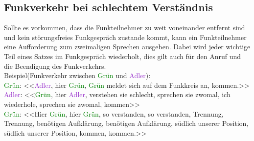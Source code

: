 \subsection{Funkverkehr bei schlechtem Verständnis}
	Sollte es vorkommen, dass die Funkteilnehmer zu weit voneinander entfernt sind und kein störungsfreies Funkgespräch zustande kommt, kann ein Funkteilnehmer eine Aufforderung zum zweimaligen Sprechen ausgeben. Dabei wird jeder wichtige Teil eines Satzes im Funkgespräch wiederholt, dies gilt auch für den Anruf und die Beendigung des Funkverkehrs. \\
	Beispiel(Funkverkehr zwischen \textcolor{green}{Grün} und \textcolor{DarkOrchid}{Adler}): \\
	\textcolor{green}{Grün}: <<\textcolor{DarkOrchid}{Adler}, hier \textcolor{green}{Grün}, \textcolor{green}{Grün} meldet sich auf dem Funkkreis an, kommen.>> \\
	\textcolor{DarkOrchid}{Adler}: <<\textcolor{green}{Grün}, hier \textcolor{DarkOrchid}{Adler}, verstehen sie schlecht, sprechen sie zwomal, ich wiederhole, sprechen sie zwomal, kommen>> \\
	\textcolor{green}{Grün}: <<Hier \textcolor{green}{Grün}, hier \textcolor{green}{Grün}, so verstanden, so verstanden, Trennung, Trennung, benötigen Aufklärung, benötigen Aufklärung, südlich unserer Position, südlich unserer Position, kommen, kommen.>> \\




